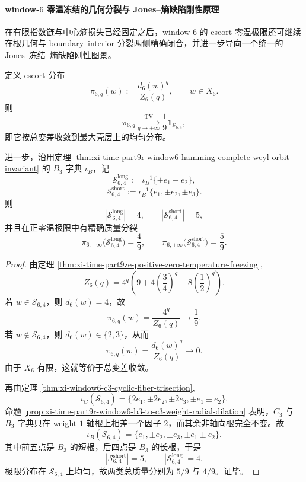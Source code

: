 \paragraph{window-\texorpdfstring{$6$}{6} 零温冻结的几何分裂与 Jones--熵缺陷刚性原理}
在有限指数链与中心熵损失已经固定之后，window-\(6\) 的 escort 零温极限还可继续在根几何与 boundary--interior 分裂两侧精确闭合，并进一步导向一个统一的 Jones--冻结--熵缺陷刚性图景。

\begin{theorem}[正零温极限的几何分裂]\label{thm:xi-time-part9ze-positive-zero-temp-geometric-splitting}
定义 escort 分布
\[
\pi_{6,q}(w):=\frac{d_6(w)^q}{Z_6(q)},
\qquad w\in X_6.
\]
则
\[
\pi_{6,q}\xrightarrow[q\to+\infty]{\mathrm{TV}}
\frac{1}{9}\mathbf 1_{\mathcal S_{6,4}},
\]
即它按总变差收敛到最大壳层上的均匀分布。

进一步，沿用定理 \ref{thm:xi-time-part9r-window6-hamming-complete-weyl-orbit-invariant} 的 \(B_3\) 字典 \(\iota_B\)，记
\[
\mathcal S_{6,4}^{\mathrm{long}}
:=
\iota_B^{-1}\{\pm e_1\pm e_2\},
\]
\[
\mathcal S_{6,4}^{\mathrm{short}}
:=
\iota_B^{-1}\{e_1,\pm e_2,\pm e_3\}.
\]
则
\[
|\mathcal S_{6,4}^{\mathrm{long}}|=4,
\qquad
|\mathcal S_{6,4}^{\mathrm{short}}|=5,
\]
并且在正零温极限中有精确质量分裂
\[
\pi_{6,+\infty}\bigl(\mathcal S_{6,4}^{\mathrm{long}}\bigr)=\frac49,
\qquad
\pi_{6,+\infty}\bigl(\mathcal S_{6,4}^{\mathrm{short}}\bigr)=\frac59.
\]
\end{theorem}
\begin{proof}
由定理 \ref{thm:xi-time-part9ze-positive-zero-temperature-freezing},
\[
Z_6(q)=4^q\left(9+4\left(\frac34\right)^q+8\left(\frac12\right)^q\right).
\]
若 \(w\in \mathcal S_{6,4}\)，则 \(d_6(w)=4\)，故
\[
\pi_{6,q}(w)=\frac{4^q}{Z_6(q)}
\longrightarrow \frac19.
\]
若 \(w\notin \mathcal S_{6,4}\)，则 \(d_6(w)\in\{2,3\}\)，从而
\[
\pi_{6,q}(w)=\frac{d_6(w)^q}{Z_6(q)}\longrightarrow 0.
\]
由于 \(X_6\) 有限，这就等价于总变差收敛。

再由定理 \ref{thm:xi-window6-c3-cyclic-fiber-trisection},
\[
\iota_C(\mathcal S_{6,4})
=
\{2e_1,\pm 2e_2,\pm 2e_3,\pm e_1\pm e_2\}.
\]
命题 \ref{prop:xi-time-part9r-window6-b3-to-c3-weight-radial-dilation} 表明，\(C_3\) 与 \(B_3\) 字典只在 weight-\(1\) 轴根上相差一个因子 \(2\)，而其余非轴向根完全不变。故
\[
\iota_B(\mathcal S_{6,4})
=
\{e_1,\pm e_2,\pm e_3,\pm e_1\pm e_2\}.
\]
其中前五点是 \(B_3\) 的短根，后四点是 \(B_3\) 的长根，于是
\[
|\mathcal S_{6,4}^{\mathrm{short}}|=5,
\qquad
|\mathcal S_{6,4}^{\mathrm{long}}|=4.
\]
极限分布在 \(\mathcal S_{6,4}\) 上均匀，故两类总质量分别为 \(5/9\) 与 \(4/9\)。证毕。
\end{proof}

